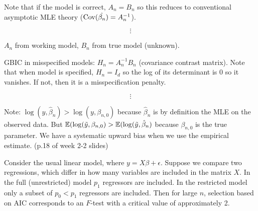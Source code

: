 Note that if the model is correct, \(A_n = B_n\) so this reduces to conventional asymptotic MLE theory (\(\mathrm{Cov}(\hat{\beta_n}) = A_n^{-1}\)).

\[
\vdots
\]

\(A_n\) from working model, \(B_n\) from true model (unknown).

GBIC in misspecified models: \(H_n = A_n^{-1} B_n\) (covariance contrast matrix). Note that when model is specified, \(H_n = I_d\) so the log of its determinant is 0 so it vanishes. If not, then it is a misspecification penalty.

\[
\vdots
\]

Note: \(\log(y, \hat{\beta}_n) > \log(y, \beta_{n,0})\) because \(\hat{\beta}_n\) is by definition the MLE on the observed data. But \(\mathbb{E}(\log(\tilde{y}, \beta_{n,0}) > \mathbb{E}(\log(\tilde{y}, \hat{\beta}_n)\) because \(\beta_{n,0}\) is the true parameter. We have a systematic upward bias when we use the empirical estimate. (p.18 of week 2-2 slides)

\begin{proposition}Consider the usual linear model, where \(y = X\beta + \epsilon\). Suppose we compare two regressions, which differ in how many variables are included in the matrix \(X\). In the full (unrestricted) model \(p_1\) regressors are included. In the restricted model only a subset of \(p_0 < p_1\) regressors are included. Then for large \(n\), selection based on AIC corresponds to an \(F\)-test with a critical value of approximately 2.

\end{proposition}

